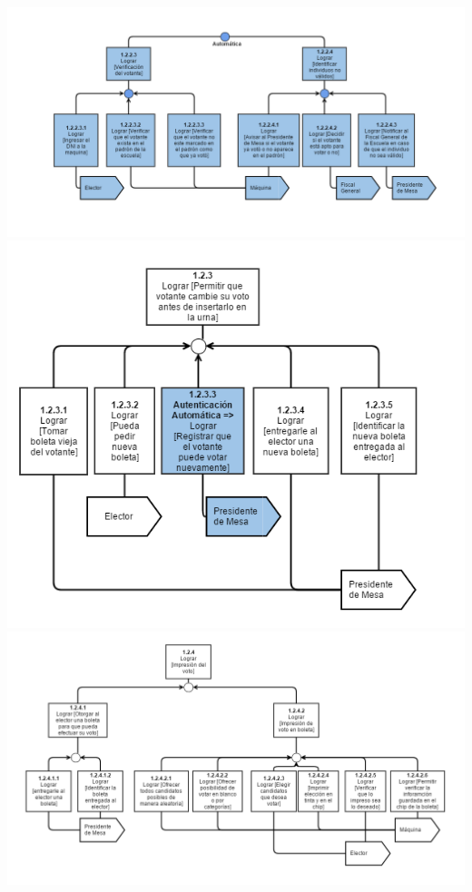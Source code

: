 \\
\includegraphics[scale=0.55]{imagenes/Diagramas/12/122b.png}
\\
\includegraphics[scale=0.55]{imagenes/Diagramas/12/123.png}
\\
\includegraphics[scale=0.55]{imagenes/Diagramas/12/124.png}
